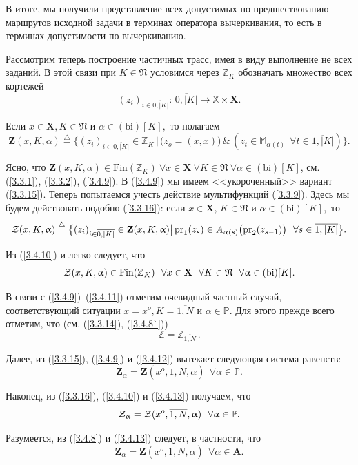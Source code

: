\documentclass[11pt,twoside,openany]{report}
\newcommand{\bfn}{\begin{equation}}
\newcommand{\efn}{\end{equation}}
\newcommand{\df}{\stackrel{\triangle}{=}}
\newcommand{\ov}{\overline}
\newcommand{\al}{\alpha}
\newcommand{\fa}{\forall}
\newcommand{\cz}{{\cal Z}}
\newcommand{\bbz}{{\mathbb Z}}
\newcommand{\bbm}{{\mathbb M}}
\newcommand{\bbx}{{\mathbb X}}
\newcommand{\bbp}{{\mathbb P}}
\begin{document}
В итоге,
мы получили представление всех допустимых по предшествованию маршрутов
исходной задачи в терминах оператора вычеркивания,
то есть в терминах допустимости по вычеркиванию.

Рассмотрим теперь построение частичных трасс,
имея в виду выполнение не всех
заданий.
В этой связи при $K\in\mathfrak{N}$
условимся через $\bbz_K$
обозначать множество всех кортежей
\bfn
  \label{3.4.8`}
  (z_i)_{i\in \ov{0,|K|}}:\,\ov{0,|K|} \longrightarrow \bbx \times \mathbf{X}
  .
\efn

Если $x\in \mathbf{X}, K\in \mathfrak{N}$ и
$\al\in (\mathrm{bi})[K],$
то полагаем
\bfn
  \label{3.4.9}
  \mathbf{Z}(x,K,\al) \df \{(z_i)_{i\in \ov{0,|K|}}\in \bbz_K\,|\,\bigl(z_o=
  (x,x)\bigl)\,\&\,(z_t\in \bbm_{\al(t)}\ \ \fa t\in \ov{1,|K|})\}
  .
\efn

Ясно, что
$\mathbf{Z}(x,K,\al) \in \mathrm{Fin}(\bbz_K)\  \fa x\in \mathbf{X}\  \fa K\in \mathfrak{N}\  \fa
\al\in (\mathrm{bi})[K]$,
см. (\ref{3.3.1}), (\ref{3.3.2}), (\ref{3.4.9}).
В (\ref{3.4.9}) мы имеем <<укороченный>> вариант
(\ref{3.3.15}).
Теперь попытаемся учесть действие мультифункций (\ref{3.3.9}).
Здесь мы будем действовать подобно (\ref{3.3.16}):
если
$x\in \mathbf{X},\, K\in \mathfrak{N}$ и $\al\in (\mathrm{bi})[K],$
то
\bfn
  \label{3.4.10}
  \cz(x,K,\al) \df \bigl\{(z_i)_{i\in\ov{0,|K|}}\in \mathbf{Z}
  (x,K,\al) \bigl|\,\mathrm{pr}_1(z_s)\in A_{\al(s)}\bigl(\mathrm{pr}_2(z_{s-1})
  \bigl)\ \ \fa s\in \ov{1,|K|}\bigl\}
  .
\efn

Из (\ref{3.4.10}) и \cite[(3.21)]{Cha3`}
легко следует, что
\bfn
  \label{3.4.11}
  \cz(x,K,\al) \in \mathrm{Fin}(\bbz_K)\ \ \fa x\in
  \mathbf{X}\ \ \fa K\in \mathfrak{N}\ \ \fa \al\in (\mathrm{bi})[K]
  .
\efn

В связи с (\ref{3.4.9})--(\ref{3.4.11})
отметим очевидный частный случай,
соответствующий ситуации
$x = x^o, K = \ov{1,N}$ и $\al\in \bbp.$
Для этого
прежде всего отметим, что (см. (\ref{3.3.14}), (\ref{3.4.8`}))
\bfn
  \label{3.4.12}
  \bbz = \bbz_{\ov{1,N}}\,
  .
\efn

Далее, из (\ref{3.3.15}), (\ref{3.4.9}) и (\ref{3.4.12}) вытекает следующая
система равенств:
\bfn
  \label{3.4.13}
  \mathbf{Z}_\al = \mathbf{Z}(x^o,\ov{1,N},\al) \ \ \fa \al\in \bbp
  .
\efn

Наконец,
из (\ref{3.3.16}), (\ref{3.4.10}) и (\ref{3.4.13})
получаем, что
\bfn
  \label{3.4.14}
  \cz_\al = \cz(x^o,\ov{1,N},\al) \ \ \fa \al\in \bbp
  .
\efn

Разумеется, из (\ref{3.4.8}) и (\ref{3.4.13}) следует, в частности, что
\bfn
  \label{3.4.15}
  \mathbf{Z}_\al = \mathbf{Z}(x^o,\ov{1,N},\al) \ \ \fa \al\in \mathbf{A}
  .
\efn
\end{document}
